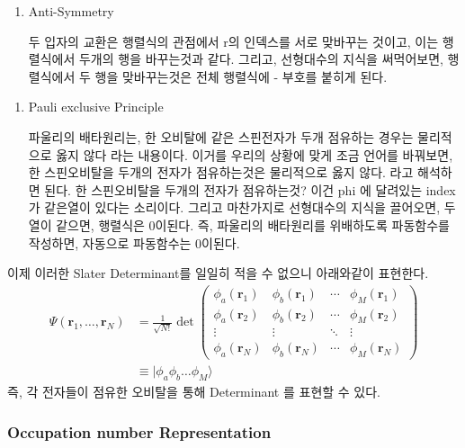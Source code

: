 \documentclass[10pt]{article}
\begin{document}
\begin{enumerate}[label=\(\mathrm{i}\))]
\item {Anti-Symmetry}

두 입자의 교환은 행렬식의 관점에서 r의 인덱스를 서로 맞바꾸는 것이고, 이는 행렬식에서 두개의 행을 바꾸는것과 같다.
그리고, 선형대수의 지식을 써먹어보면, 행렬식에서 두 행을 맞바꾸는것은 전체 행렬식에 - 부호를 붙히게 된다. 
\end{enumerate}

\begin{enumerate}[label=\(\mathrm{ii}\))]
\item {Pauli exclusive Principle}

파울리의 배타원리는, 한 오비탈에 같은 스핀전자가 두개 점유하는 경우는 물리적으로 옳지 않다 라는 내용이다. 
이거를 우리의 상황에 맞게 조금 언어를 바꿔보면, 한 스핀오비탈을 두개의 전자가 점유하는것은 물리적으로 옳지 않다. 라고 해석하면 된다. 
한 스핀오비탈을 두개의 전자가 점유하는것? 이건 phi 에 달려있는 index가 같은열이 있다는 소리이다. 
그리고 마찬가지로 선형대수의 지식을 끌어오면, 두 열이 같으면, 행렬식은 0이된다. 
즉, 파울리의 배타원리를 위배하도록 파동함수를 작성하면, 자동으로 파동함수는 0이된다. 
\end{enumerate}
이제 이러한 Slater Determinant를 일일히 적을 수 없으니 아래와같이 표현한다. 
\begin{align*}
\Psi(\mathbf{r}_1, \dots, \mathbf{r}_N) 
&= \frac{1}{\sqrt{N!}} \det \begin{pmatrix}
\phi_a(\mathbf{r}_1) & \phi_b(\mathbf{r}_1) & \cdots & \phi_M(\mathbf{r}_1) \\
\phi_a(\mathbf{r}_2) & \phi_b(\mathbf{r}_2) & \cdots & \phi_M(\mathbf{r}_2) \\
\vdots & \vdots & \ddots & \vdots \\
\phi_a(\mathbf{r}_N) & \phi_b(\mathbf{r}_N) & \cdots & \phi_M(\mathbf{r}_N) 
\end{pmatrix} \\
& \equiv \vert \phi_a \phi_b \dots \phi_M\rangle
\end{align*}
즉, 각 전자들이 점유한 오비탈을 통해 Determinant 를 표현할 수 있다. 



\subsubsection{Occupation number Representation}
\end{document}
